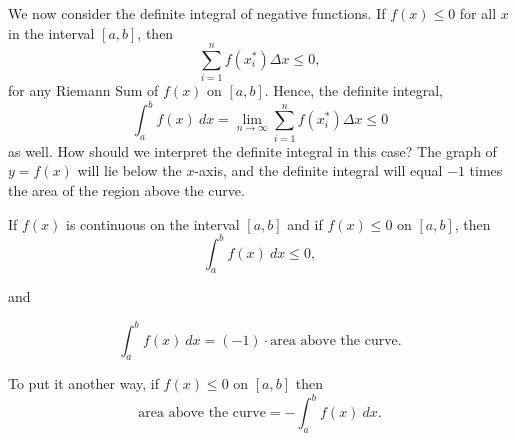 \documentclass{ximera}
\begin{document}
We now consider the definite integral of negative functions.
If $f(x) \leq 0$ for all $x$ in the interval $[a,b]$, then 
\[\sum_{i=1}^n f(x_i^*) \Delta x \leq 0,\]
for any Riemann Sum of $f(x)$ on $[a, b]$.
Hence, the definite integral,
\[
\int_a^b f(x) \ dx = \lim_{n \to \infty} \sum_{i=1}^n f(x_i^*) \Delta x \leq 0
\]
as well. How should we interpret the definite integral in this case? The graph of $y = f(x)$ will lie below the $x$-axis, 
and the definite integral will equal $-1$ times the area of the region above the curve. 

\begin{proposition}
If $f(x)$ is continuous on the interval $[a, b]$ and if $f(x) \leq 0$ on $[a,b]$,
then 
\[ \int_a^b f(x) \ dx \leq 0,\]

and 

\[\int_a^b f(x) \ dx = (-1) \cdot \text{area above the curve}.\]
\end{proposition}

To put it another way, if $f(x) \leq 0$ on $[a,b]$ then
\[\text{area above the curve} = -\int_a^b f(x) \ dx.\]
\end{document}
